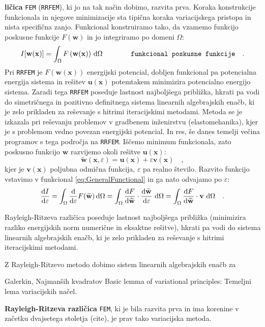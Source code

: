 \textbf{ličica} \texttt{FEM} (\texttt{RRFEM}), ki jo na tak način dobimo, razvita prva. Koraka konstrukcije funkcionala in njegove minimizacije sta tipična koraka variacijskega pristopa in nista specifična zanjo. Funkcional konstruiramo tako, da vzamemo funkcijo poskusne funkcije $F\left(\mathbf{w}\right)$ in jo integriramo po domeni $\Omega$:
\begin{equation}
	I[\mathbf{w}(\mathbf{x})] = \int_{\Omega} F\left(\mathbf{w}(\mathbf{x})\right) \, \mathrm{d} \Omega \hspace{1.4cm} \texttt{funkcional poskusne funkcije} \quad .
	\label{eq:GeneralFunctional}
\end{equation}
Pri \texttt{RRFEM} je $F\left(\mathbf{w}(\mathbf{x})\right)$ energijski potencial, dobljen funkcional pa potencialna energija sistema in rešitev $\mathbf{u}(\mathbf{x})$ potemtakem minimizira potencialno energijo sistema. Zaradi tega \texttt{RRFEM} poseduje lastnost najboljšega približka, hkrati pa vodi do simetričnega in pozitivno definitnega sistema linearnih algebrajskih enačb, ki je zelo prikladen za reševanje s hitrimi iteracijskimi metodami. Metoda se je izkazala pri reševanju problemov v gradbenem inženirstvu (elastomehanika), kjer je s problemom vedno povezan energijski potencial. In res, še danes temelji večina programov s tega področja na \texttt{RRFEM}. Iščemo minimum funkcionala, zato poskusno funkcijo $\mathbf{w}$ razvijemo okoli rešitve $\mathbf{u}(\mathbf{x})$:
\begin{equation}
	\widetilde{\mathbf{w}}(\mathbf{x}, \varepsilon) = \mathbf{u}(\mathbf{x}) + \varepsilon \mathbf{v}(\mathbf{x}) \quad ,
\end{equation}
kjer je $\mathbf{v}(\mathbf{x})$ poljubna odmična funkcija, $\varepsilon$ pa realno število. Razvito funkcijo vstavimo v funkcional \eqref{eq:GeneralFunctional} in ga nato odvajamo po $\varepsilon$:
\begin{equation}
\frac{\mathrm{d} I}{\mathrm{d} \varepsilon} = \int_{\Omega} \frac{\mathrm{d}}{\mathrm{d} \varepsilon} F(\widetilde{\mathbf{w}}) \, \mathrm{d} \Omega = \int_{\Omega} \frac{\mathrm{d} F}{\mathrm{d} \widetilde{\mathbf{w}}} \cdot \frac{\mathrm{d} \widetilde{\mathbf{w}}}{\mathrm{d} \varepsilon} \ \mathrm{d} \Omega = \int_{\Omega} \frac{\mathrm{d} F}{\mathrm{d} \widetilde{\mathbf{w}}} \cdot \mathbf{v} \ \mathrm{d} \Omega \quad .
\end{equation}

 Rayleigh-Ritzeva različica poseduje lastnost najboljšega približka (minimizira razliko energijskih norm numerične in eksaktne rešitve), hkrati pa vodi do sistema linearnih algebrajskih enačb, ki je zelo prikladen za reševanje s hitrimi iteracijskimi metodami.

Z Rayleigh-Ritzevo metodo dobimo sistem linearnih algebrajskih enačb za 

Galerkin, Najmanših kvadratov \cite{JiangB-LSFEM}
Basic lemma of variational principles: Temeljni lema variacijskih načel.

\textbf{Rayleigh-Ritzeva različica} \texttt{FEM}, ki je bila razvita prva in ima korenine v začetku dvajsetega stoletja (cite), je prav tako variacijska metoda.